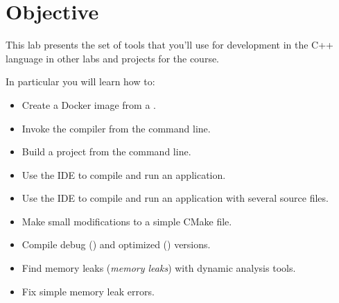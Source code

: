 \section{Objective}

This lab presents the set of tools that you'll use for development in the C++
language in other labs and projects for the course.

In particular you will learn how to:

\begin{itemize}

  \item Create a Docker image from a .

  \item Invoke the compiler from the command line.

  \item Build a project from the command line.

  \item Use the IDE  to compile and run an application.

  \item Use the IDE  to compile and run an application with several source files.

  \item Make small modifications to a simple CMake file.

  \item Compile debug () and optimized () versions.

  \item Find memory leaks (\emph{memory leaks}) with dynamic analysis tools.

  \item Fix simple memory leak errors.

\end{itemize}
